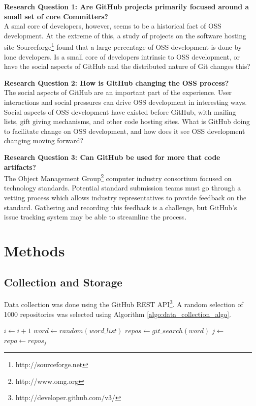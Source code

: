 \documentclass{proc}
\begin{document}
\noindent \textbf{Research Question 1: Are GitHub projects primarily focused around a small set of core Committers?}\\
A smal core of developers, however, seems to be a historical fact of OSS development\cite{mockus2000case,mockus2002two,krishnamurthy2002cave}. At the extreme of this, a study of projects on the software hosting site Sourceforge\footnote{http://sourceforge.net} found that a large percentage of OSS development is done by lone developers. Is a small core of developers intrinsic to OSS development, or have the social aspects of GitHub and the distributed nature of Git changes this?

\noindent \textbf{Research Question 2: How is GitHub changing the OSS process?}\\
The social aspects of GitHub are an important part of the experience\cite{dabbish2012social}. User interactions and social pressures can drive OSS development in interesting ways. Social aspects of OSS development have existed before GitHub, with mailing lists\cite{mockus2000case}, gift giving mechanisms\cite{bergquist2008power}, and other code hosting sites. What is GitHub doing to facilitate change on OSS development, and how does it see OSS development changing moving forward?

\noindent \textbf{Research Question 3: Can GitHub be used for more that code artifacts?}\\
The Object Management Group\textregistered\footnote{http://www.omg.org} computer industry consortium focused on technology standards. Potential standard submission teams must go through a vetting process\cite{kobryn1999uml} which allows industry representatives to provide feedback on the standard. Gathering and recording this feedback is a challenge, but GitHub's issue tracking system may be able to streamline the process.

\section{Methods}
\subsection{Collection and Storage}
Data collection was done using the GitHub REST API\footnote{http://developer.github.com/v3/}. A random selection of 1000 repositories was selected using Algorithm \ref{algo:data_collection_algo}.

\begin{algorithm}[H]
\label{algo:data_collection_algo}
\begin{algorithmic}[1]
\State $i \gets i + 1$
\State $word \gets random(word\_list)$
\State $repos \gets git\_search(word)$
\State $j \gets $%
\State $repo \gets repos_j$
\State {}
\EndWhile
\end{algorithmic}
\end{algorithm}
\end{document}

